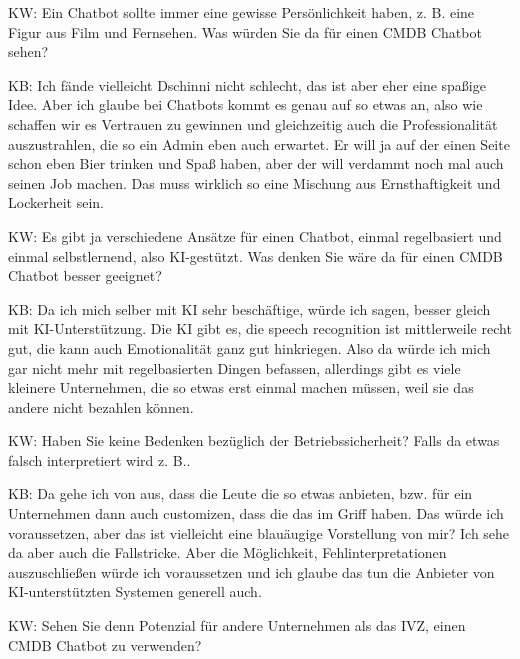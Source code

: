 \begin{list}{X:}{\setlength{\labelsep}{5mm}}
\item[KW:] Ein Chatbot sollte immer eine gewisse Persönlichkeit haben, z. B. eine Figur aus Film und Fernsehen. Was würden Sie da für einen CMDB Chatbot sehen?
\item[KB:] Ich fände vielleicht Dschinni nicht schlecht, das ist aber eher eine spaßige Idee. Aber ich glaube bei Chatbots kommt es genau auf so etwas an, also wie schaffen wir es Vertrauen zu gewinnen und gleichzeitig auch die Professionalität auszustrahlen, die so ein Admin eben auch erwartet. Er will ja auf der einen Seite schon eben Bier trinken und Spaß haben, aber der will verdammt noch mal auch seinen Job machen. Das muss wirklich so eine Mischung aus Ernsthaftigkeit und Lockerheit sein. 
\item[KW:] Es gibt ja verschiedene Ansätze für einen Chatbot, einmal regelbasiert und einmal selbstlernend, also KI-gestützt. Was denken Sie wäre da für einen CMDB Chatbot besser geeignet?
\item[KB:] Da ich mich selber mit KI sehr beschäftige, würde ich sagen, besser gleich mit KI-Unterstützung. Die KI gibt es, die speech recognition ist mittlerweile recht gut, die kann auch Emotionalität ganz gut hinkriegen. Also da würde ich mich gar nicht mehr mit regelbasierten Dingen befassen, allerdings gibt es viele kleinere Unternehmen, die so etwas erst einmal machen müssen, weil sie das andere nicht bezahlen können.
\item[KW:] Haben Sie keine Bedenken bezüglich der Betriebssicherheit? Falls da etwas falsch interpretiert wird z. B..
\item[KB:] Da gehe ich von aus, dass die Leute die so etwas anbieten, bzw. für ein Unternehmen dann auch customizen, dass die das im Griff haben. Das würde ich voraussetzen, aber das ist vielleicht eine blauäugige Vorstellung von mir? Ich sehe da aber auch die Fallstricke. Aber die Möglichkeit, Fehlinterpretationen auszuschließen würde ich voraussetzen und ich glaube das tun die Anbieter von KI-unterstützten Systemen generell auch. 
\item[KW:] Sehen Sie denn Potenzial für andere Unternehmen als das IVZ, einen CMDB Chatbot zu verwenden?

\end{list}
